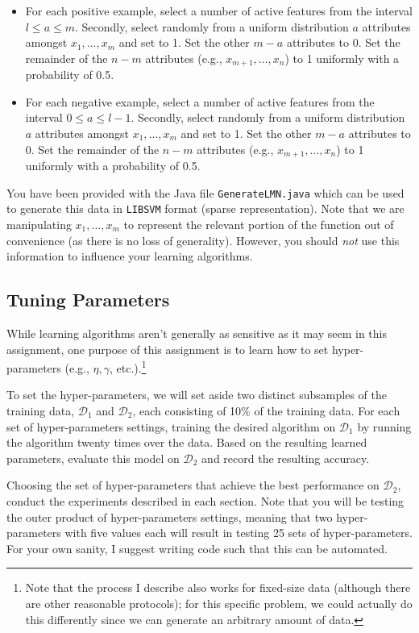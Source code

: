 \documentclass[12pt,letterpaper]{article}
\begin{document}
\begin{enumerate}
\begin{itemize}
\item
For each positive example, select a number of active features from the interval $l \leq a \leq m$.  Secondly, select randomly from a uniform distribution $a$ attributes amongst $x_1, \ldots, x_m$ and set to 1.  Set the other $m - a$ attributes to 0.  Set the remainder of the $n-m$ attributes (e.g., $x_{m+1}, \ldots, x_{n}$) to 1 uniformly with a probability of 0.5.
\item
For each negative example, select a number of active features from the interval $0 \leq a \leq l-1$.  Secondly, select randomly from a uniform distribution $a$ attributes amongst $x_1, \ldots, x_m$ and set to 1.  Set the other $m - a$ attributes to 0.  Set the remainder of the $n-m$ attributes (e.g., $x_{m+1}, \ldots, x_{n}$) to 1 uniformly with a probability of 0.5.
\end{itemize}
%
\noindent
You have been provided with the Java file {\tt GenerateLMN.java} which can be used to generate this data in {\tt LIBSVM} format (sparse representation).  Note that we are manipulating $x_1, \ldots, x_m$ to represent the relevant portion of the function out of convenience (as there is no loss of generality).  However, you should {\em not} use this information to influence your learning algorithms.

\subsection*{Tuning Parameters}

While learning algorithms aren't generally as sensitive as it may seem in this assignment, one purpose of this assignment is to learn how to set hyper-parameters (e.g., $\eta, \gamma$, etc.).\footnote{Note that the process I describe also works for fixed-size data (although there are other reasonable protocols); for this specific problem, we could actually do this differently since we can generate an arbitrary amount of data.}  

To set the hyper-parameters, we will set aside two distinct subsamples of the training data, $\mathcal{D}_1$ and $\mathcal{D}_2$, each consisting of 10\% of the training data.  For each set of hyper-parameters settings, training the desired algorithm on $\mathcal{D}_1$ by running the algorithm twenty times over the data.  Based on the resulting learned parameters, evaluate this model on $\mathcal{D}_2$ and record the resulting accuracy.

Choosing the set of hyper-parameters that achieve the best performance on $\mathcal{D}_2$, conduct the experiments described in each section.  Note that you will be testing the outer product of hyper-parameters settings, meaning that two hyper-parameters with five values each will result in testing 25 sets of hyper-parameters. For your own sanity, I suggest writing code such that this can be automated.


\end{enumerate}
\end{document}
